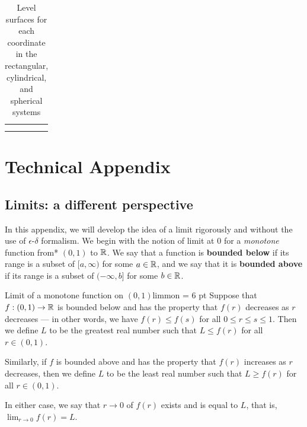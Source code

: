 \documentclass{watsonbook}
\begin{document}
\begin{table}[h!]
  \centering
  \begin{tabular}{M{4.2cm}|M{4.2cm}|M{4.2cm}}
    \usebox{\xconstantfig} & \usebox{\yconstantfig} & \usebox{\zconstantfig}  \\ \hline
    \usebox{\rconstantfig} & \usebox{\thetaconstantfig}  & \usebox{\zconstantfig}  \\ \hline
    \usebox{\rhoconstantfig} & \usebox{\thetaconstantfig}  & \usebox{\phiconstantfig}  \\ \hline
  \end{tabular}
  \caption{Level surfaces for each coordinate
    in the rectangular, cylindrical, and spherical
    systems \label{table:coordinateslices}}
\end{table}

\newpage

\section{Technical Appendix}

\subsection{Limits: a different perspective}
\label{sec:limitsappendix}

In this appendix, we will develop the idea of a limit rigorously and
without the use of $\epsilon$-$\delta$ formalism.  We begin with the
notion of limit at 0 for a \textit{monotone} function from*
 $(0,1)$ to
$\mathbb{R}$. We say that a function is \textbf{bounded below} if its range is
a subset of $[a,\infty)$ for some $a \in \mathbb{R}$, and we say that it is
\textbf{bounded above} if its range is a subset of $(-\infty,b]$ for
some $b \in \mathbb{R}$. 

\begin{defn}{Limit of a monotone function on $(0,1)$}{limmon} \parskip = 6 pt 
  Suppose that $f:(0,1) \to \mathbb{R}$ is bounded below and has the property
  that $f(r)$ decreases as $r$ decreases --- in other words,
  we have $f(r) \leq f(s)$ for all $0 \leq r \leq s \leq 1$. Then we define
  $L$ to be the greatest real number such that $L \leq f(r)$ for all
  $r\in (0,1)$. 

  Similarly, if $f$ is bounded above and has the property that $f(r)$
  increases as $r$ decreases, then we define $L$ to be the least real
  number such that $L \geq f(r)$ for all $r \in (0,1)$.

  In either case, we say that $r\to0$ of $f(r)$ exists and is equal to
  $L$, that is,  $\displaystyle{\lim_{r\to 0} f(r) = L}$. 
\end{defn}
\end{document}
